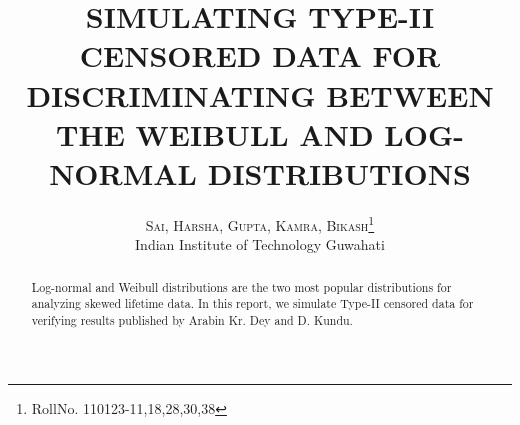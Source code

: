 \documentclass[twoside]{article}
\title{\vspace{-15mm}\fontsize{24pt}{10pt}\selectfont\textbf{SIMULATING TYPE-II CENSORED DATA FOR DISCRIMINATING BETWEEN THE WEIBULL AND LOG-NORMAL DISTRIBUTIONS}} %
\author{
\large
\textsc{Sai, Harsha, Gupta, Kamra, Bikash}\thanks{RollNo. 110123-11,18,28,30,38}\\[2mm] %
\normalsize Indian Institute of Technology Guwahati \\ %
\vspace{-5mm}
}
\date{}
\begin{document}
\maketitle %

\thispagestyle{fancy} %


\begin{abstract}

Log-normal and Weibull distributions are the two most popular distributions for analyzing skewed lifetime data. In this report, we simulate Type-II censored data for verifying results published by Arabin Kr. Dey and D. Kundu.

\end{abstract}

\end{document}
